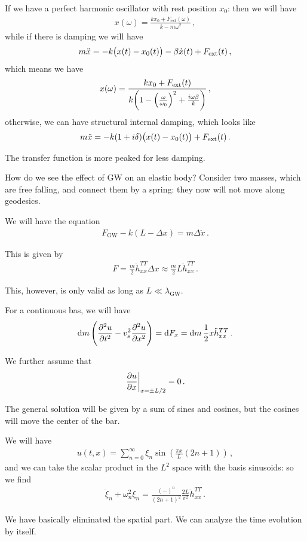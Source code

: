 \documentclass[main.tex]{subfiles}
\begin{document}
If we have a perfect harmonic oscillator with rest position \(x_0 \): then we will have 
%
\begin{align}
x(\omega ) = \frac{k x_0 + F _{\text{ext}}(\omega )}{k - m \omega^2}
\,,
\end{align}
%
while if there is damping we will have 
%
\begin{align}
m \ddot{x} = - k \qty(x(t) - x_0 (t)) - \beta \dot{x}(t) + F _{\text{ext}}(t)
\,,
\end{align}
%
which means we have 
%
\begin{align}
x(\omega ) = \frac{k x_0 + F _{\text{ext}}(t)}{k \qty(1 - \qty( \frac{\omega}{\omega_0 })^2 + \frac{i \omega \beta }{k})}
\,,
\end{align}
%
otherwise, we can have structural internal damping, which looks like 
%
\begin{align}
m \ddot{x} = - k (1 + i \delta ) \qty(x(t) - x_0 (t)) + F _{\text{ext}}(t)
\,.
\end{align}

The transfer function is more peaked for less damping. 

How do we see the effect of GW on an elastic body? Consider two masses, which are free falling, and connect them by a spring: they now will not move along geodesics.

We will have the equation 
%
\begin{align}
F _{\text{GW}} - k (L - \Delta x) = m \Delta \ddot{x}
\,.
\end{align}

This is given by 
%
\begin{align}
F = \frac{m}{2} \ddot{h}^{TT}_{xx} \Delta x \approx \frac{m}{2} L \ddot{h}^{TT}_{xx}
\,.
\end{align}

This, however, is only valid as long as \(L \ll \lambda _{\text{GW}}\). 

For a continuous bas, we will have 
%
\begin{align}
\dd{m} \qty(\pdv[2]{u}{t} - v_s^2 \pdv[2]{u}{x}) = \dd{F_x} = \dd{m} \frac{1}{2} x \ddot{h}_{xx}^{TT}
\,.
\end{align}
%

We further assume that 
%
\begin{align}
\eval{\pdv{u}{x}}_{x = \pm L/2} = 0
\,.
\end{align}

The general solution will be given by a sum of sines and cosines, but the cosines will move the center of the bar. 

We will have 
%
\begin{align}
u(t, x) = \sum _{n=0}^{ \infty } \xi_{n} \sin( \frac{\pi x}{L} (2 n + 1))
\,,
\end{align}
%
and we can take the scalar product in the \(L^{2}\) space with the basis sinusoids: so we find 
%
\begin{align}
\ddot{\xi}_{n} + \omega^2_{n} \xi_{n} = \frac{(-)^{n}}{(2n+1)^2} \frac{2L}{\pi^2} \ddot{h}^{TT}_{xx}
\,.
\end{align}

We have basically eliminated the spatial part. 
We can analyze the time evolution by itself. 
\end{document}
